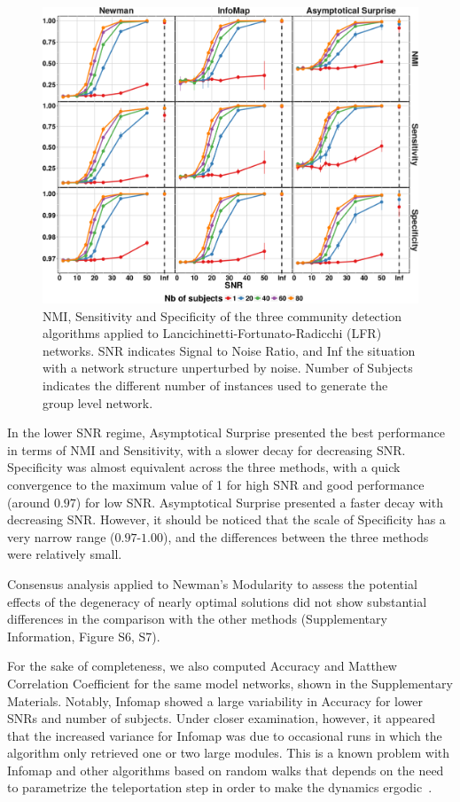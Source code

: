 \begin{figure}[htb!]
\includegraphics[width=\textwidth]{images/pacopaperfigure5.pdf}
\caption{NMI, Sensitivity and Specificity of the three community detection algorithms applied to Lancichinetti-Fortunato-Radicchi (LFR) networks. SNR indicates Signal to Noise Ratio, and Inf the situation with a network structure unperturbed by noise. Number of Subjects indicates the different number of instances used to generate the group level network.}
\label{fig:nmisensitivityspecificitylfr}
\end{figure}

In the lower SNR regime, Asymptotical Surprise presented the best performance in terms of NMI and Sensitivity, with a slower decay for decreasing SNR. 
Specificity was almost equivalent across the three methods, with a quick convergence to the maximum value of 1 for high SNR and good performance (around $0.97$) for low SNR.
Asymptotical Surprise presented a faster decay with decreasing SNR.
However, it should be noticed that the scale of Specificity has a very narrow range ($0.97$-$1.00$), and the differences between the three methods were relatively small.

Consensus analysis applied to Newman's Modularity to assess the potential effects of the degeneracy of nearly optimal solutions did not show substantial differences in the comparison with the other methods (Supplementary Information, Figure S6, S7).

For the sake of completeness, we also computed Accuracy and Matthew Correlation Coefficient for the same model networks, shown in the Supplementary Materials.
Notably, Infomap showed a large variability in Accuracy for lower SNRs and number of subjects.
Under closer examination, however, it appeared that the increased variance for Infomap was due to occasional runs in which the algorithm only retrieved one or two large modules.
This is a known problem with Infomap and other algorithms based on random walks that depends on the need to parametrize the teleportation step in order to make the dynamics ergodic~\cite{lambiotte2012}.

